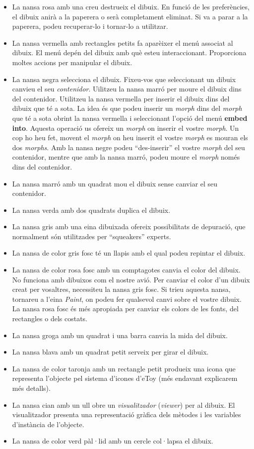 \begin{itemize}
\item La nansa rosa amb una creu destrueix el dibuix. En funció de les preferències, el dibuix anirà a la paperera o serà completament eliminat. Si va a parar a la paperera, podeu recuperar-lo i tornar-lo a utilitzar.
\item La nansa vermella amb rectangles petits fa aparèixer el menú associat al dibuix. El menú depén del dibuix amb què esteu interaccionant. Proporciona moltes accions per manipular el dibuix.
\item La nansa negra selecciona el dibuix. Fixeu-vos que seleccionant un dibuix canvieu el seu \emph{contenidor}. Uilitzeu la nansa marró per moure el dibuix dins del contenidor. Utilitzeu la nansa vermella per inserir el dibuix dins del dibuix que té a sota. La idea és que podeu inserir un \emph{morph} dins del \emph{morph} que té a sota obrint la nansa vermella i seleccionant l'opció del menú \textbf{embed into}. Aquesta operació us ofereix un \emph{morph} on inserir el vostre \emph{morph}. Un cop ho heu fet, movent el \emph{morph} on heu inserit el vostre \emph{morph} es mouran els dos \emph{morphs}. Amb la nansa negre podeu ``des-inserir'' el vostre \emph{morph} del seu contenidor, mentre que amb la nansa marró, podeu moure el \emph{morph} només dins del contenidor.
\item La nansa marró amb un quadrat mou el dibuix sense canviar el seu contenidor.
\item La nansa verda amb dos quadrats duplica el dibuix.
\item La nansa gris amb una eina dibuixada ofereix possibilitats de depuració, que normalment són utilitzades per ``squeakers'' experts.
\item La nansa de color gris fosc té un llapis amb el qual podeu repintar el dibuix.
\item La nansa de color rosa fosc amb un comptagotes canvia el color del dibuix. No funciona amb dibuixos com el nostre avió. Per canviar el color d'un dibuix creat per vosaltres, necessiteu la nansa gris fosc. Si trieu aquesta nansa, tornareu a l'eina \emph{Paint}, on podeu fer qualsevol canvi sobre el vostre dibuix. La nansa rosa fosc és més apropiada per canviar els colors de les fonts, del rectangles o dels costats.
\item La nansa groga amb un quadrat i una barra canvia la mida del dibuix.
\item La nansa blava amb un quadrat petit serveix per girar el dibuix.
\item La nansa de color taronja amb un rectangle petit produeix una icona que representa l'objecte pel sistema d'icones d'eToy (més endavant explicarem més detalls).
\item La nansa cian amb un ull obre un \emph{visualitzador} (\emph{viewer}) per al dibuix. El visualitzador presenta una representació gràfica dels mètodes i les variables d'instància de l'objecte.
\item La nansa de color verd pàl·lid amb un cercle col·lapsa el dibuix.
\end{itemize}

